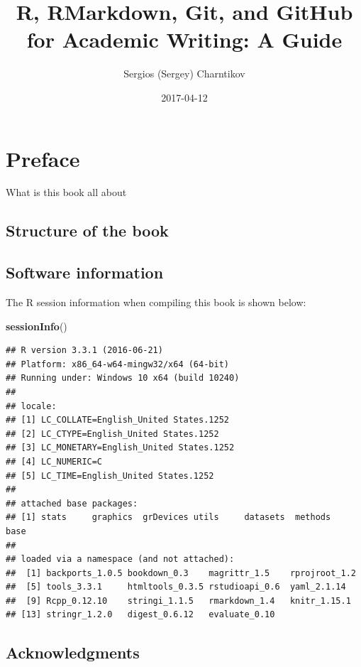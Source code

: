 \documentclass[]{book}
\title{R, RMarkdown, Git, and GitHub for Academic Writing: A Guide}
\author{Sergios (Sergey) Charntikov}
\date{2017-04-12}
\newenvironment{Shaded}{\begin{snugshade}}{\end{snugshade}}
\newcommand{\KeywordTok}[1]{\textcolor[rgb]{0.13,0.29,0.53}{\textbf{{#1}}}}
\newcommand{\NormalTok}[1]{{#1}}
\begin{document}
\maketitle

{
\setcounter{tocdepth}{1}
\tableofcontents
}
\chapter{Preface}\label{preface}

What is this book all about

\section{Structure of the book}\label{structure-of-the-book}

\section{Software information}\label{software-information}

The R session information when compiling this book is shown below:

\begin{Shaded}
\begin{Highlighting}[]
\KeywordTok{sessionInfo}\NormalTok{()}
\end{Highlighting}
\end{Shaded}

\begin{verbatim}
## R version 3.3.1 (2016-06-21)
## Platform: x86_64-w64-mingw32/x64 (64-bit)
## Running under: Windows 10 x64 (build 10240)
## 
## locale:
## [1] LC_COLLATE=English_United States.1252 
## [2] LC_CTYPE=English_United States.1252   
## [3] LC_MONETARY=English_United States.1252
## [4] LC_NUMERIC=C                          
## [5] LC_TIME=English_United States.1252    
## 
## attached base packages:
## [1] stats     graphics  grDevices utils     datasets  methods   base     
## 
## loaded via a namespace (and not attached):
##  [1] backports_1.0.5 bookdown_0.3    magrittr_1.5    rprojroot_1.2  
##  [5] tools_3.3.1     htmltools_0.3.5 rstudioapi_0.6  yaml_2.1.14    
##  [9] Rcpp_0.12.10    stringi_1.1.5   rmarkdown_1.4   knitr_1.15.1   
## [13] stringr_1.2.0   digest_0.6.12   evaluate_0.10
\end{verbatim}

\section{Acknowledgments}\label{acknowledgments}
\end{document}
